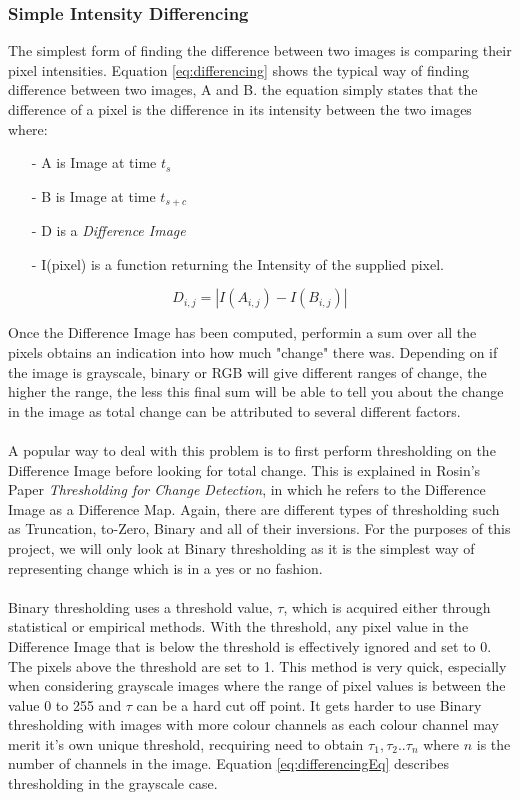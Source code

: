 \documentclass[11pt]{article}
\begin{document}
\subsubsection{Simple Intensity Differencing}
The simplest form of finding the difference between two images is comparing 
their pixel intensities. Equation \ref{eq:differencing} shows the typical
way of finding difference between two images, A and B. the equation 
simply states that the difference of a pixel is the difference in its 
intensity between the two images where:
\begin{itemize}
	\item[-] A is Image at time $t_{s}$
	\item[-] B is Image at time $t_{s+c}$
	\item[-] D is a \textit{Difference Image}
	\item[-] I(pixel) is a function returning the Intensity of the 
			supplied pixel.
\end{itemize}

\begin{equation}
		D_{i,j} = | I(A_{i,j}) - I(B_{i,j}) | 	
		\label{eq:differencing}
\end{equation} 

Once the Difference Image has been computed, performin a 
sum over all the pixels obtains an indication into how much "change"
there was. Depending on if the image is grayscale, binary or RGB will
give different ranges of change, the higher the range, the less
this final sum will be able to tell you about the change in the image as
total change can be attributed to several different factors.\\
\\
A popular way to deal with this problem is to first perform 
thresholding on the Difference Image before looking for total
change. This is explained in Rosin's Paper
\textit{Thresholding for Change Detection}\cite{Rosin}, in which he
refers to the Difference Image as a Difference Map. 
Again, there are different types of thresholding
such as Truncation, to-Zero, Binary and all of their inversions. 
For the purposes of this project, we will only look at Binary 
thresholding as it is the simplest way of representing change which
is in a yes or no fashion. \\
\\
Binary thresholding uses a threshold value, $\tau$, which is 
acquired either through statistical or empirical methods. With
the threshold, any pixel value in the Difference Image that is below
the threshold is effectively ignored and set to 0. The pixels above
the threshold are set to 1. This method is very quick,
especially when considering grayscale images where the range of
pixel values is between the value 0 to 255 and $\tau$ can be a hard
cut off point. It gets harder to use Binary thresholding with images 
with more colour channels as each colour channel may merit it's own
unique threshold, recquiring need to obtain $\tau_{1}, \tau_{2} .. \tau_{n}$
where $n$ is the number of channels in the image. 
Equation \ref{eq:differencingEq} describes thresholding in the grayscale 
case.
\end{document}
